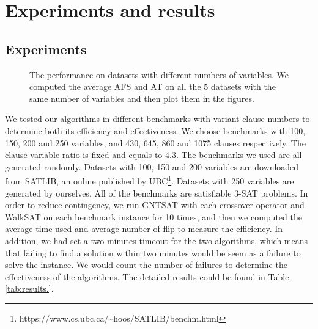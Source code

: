 
\section{Experiments and results}
\subsection{Experiments}
\begin{figure}[htbp]
	\centering
	\caption{The performance on datasets with different numbers of variables. We computed
		the average AFS and AT on all the 5 datasets with the same number of variables
		and then plot them in the figures.}
	\label{fig:performance}
\end{figure}
We tested our algorithms in different benchmarks with variant clause numbers
to determine both its efficiency and effectiveness. We choose benchmarks with
100, 150, 200 and 250 variables, and 430, 645, 860 and 1075 clauses
respectively. The clause-variable ratio is fixed and equals to 4.3. The
benchmarks we used are all generated randomly. Datasets with 100, 150 and 200
variables are downloaded from SATLIB, an online published by
UBC\footnote{https://www.cs.ubc.ca/\textasciitilde hoos/SATLIB/benchm.html}. Datasets with 250 variables are generated by
ourselves. All of the benchmarks are satisfiable 3-SAT problems. In order to
reduce contingency, we run GNTSAT with each crossover operator and WalkSAT on
each benchmark instance for 10 times, and then we computed the average time
used and average number of flip to measure the efficiency. In addition, we had
set a two minutes timeout for the two algorithms, which means that failing to
find a solution within two minutes would be seem as a failure to solve the
instance. We would count the number of failures to determine the effectiveness
of the algorithms. The detailed results could be found in
Table.\ref{tab:results.}.

